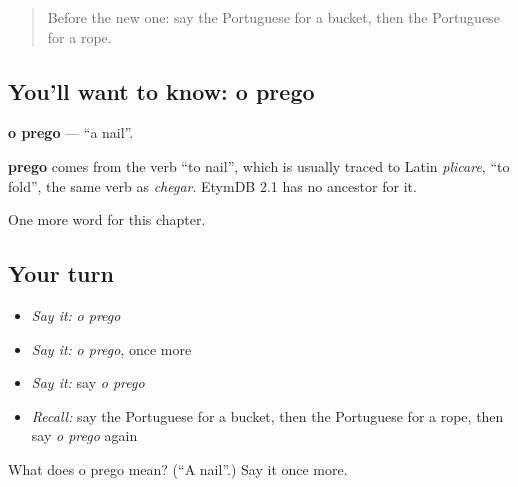 \label{lesson:PT-C97-prego}



\begin{quote}
Before the new one: say the Portuguese for a bucket, then the Portuguese for a rope.
\end{quote}

\subsection*{You'll want to know: o prego}
\textbf{o prego} — \textquotedblleft{}a nail\textquotedblright{}.

\begin{cousinweb}
\textbf{prego} comes from the verb \textquotedblleft{}to nail\textquotedblright{}, which is usually traced to Latin \emph{plicare}, \textquotedblleft{}to fold\textquotedblright{}, the same verb as \emph{chegar}. EtymDB 2.1 has no ancestor for it.
\end{cousinweb}

\begin{grammarlens}[title={What you've built}]
One more word for this chapter.
\end{grammarlens}

\subsection*{Your turn}
\begin{itemize}
\raggedright
  \item \emph{Say it:} \emph{o prego}
  \item \emph{Say it:} \emph{o prego}, once more
  \item \emph{Say it:} say \emph{o prego}
  \item \emph{Recall:} say the Portuguese for a bucket, then the Portuguese for a rope, then say \emph{o prego} again
\end{itemize}

\begin{tcolorbox}[breakable,colback=teal!4,colframe=teal!35!black,title={Before you move on}]
What does o prego mean? (\textquotedblleft{}A nail\textquotedblright{}.) Say it once more.
\end{tcolorbox}
